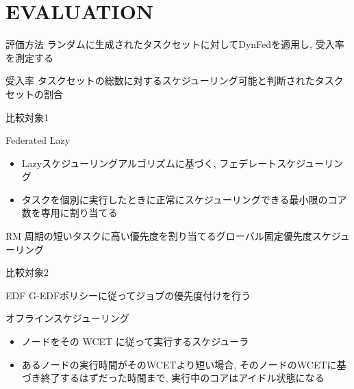 
\section{EVALUATION}
\label{sec: eva}

\begin{frame}{評価方法}
    ランダムに生成されたタスクセットに対してDynFedを適用し, 受入率を測定する
    \begin{block}{受入率}
        タスクセットの総数に対するスケジューリング可能と判断されたタスクセットの割合
    \end{block}
\end{frame}

\begin{frame}{比較対象1}
    \begin{block}{Federated Lazy}
        \setlength{\linewidth}{0.98\columnwidth}
        \begin{itemize}
            \item Lazyスケジューリングアルゴリズムに基づく, フェデレートスケジューリング
            \item タスクを個別に実行したときに正常にスケジューリングできる最小限のコア数を専用に割り当てる
        \end{itemize}
    \end{block}
    \begin{block}{RM}
        周期の短いタスクに高い優先度を割り当てるグローバル固定優先度スケジューリング
    \end{block}
\end{frame}

\begin{frame}{比較対象2}
    \begin{block}{EDF}
        G-EDFポリシーに従ってジョブの優先度付けを行う
    \end{block}
    \begin{block}{オフラインスケジューリング}
        \begin{itemize}
            \setlength{\linewidth}{0.98\columnwidth}
            \item ノードをその WCET に従って実行するスケジューラ
            \item あるノードの実行時間がそのWCETより短い場合, そのノードのWCETに基づき終了するはずだった時間まで, 実行中のコアはアイドル状態になる
        \end{itemize}
    \end{block}
\end{frame}

